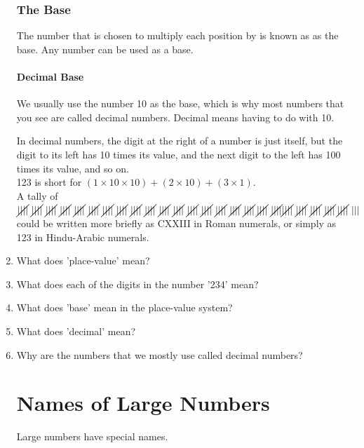 \documentclass{article}
\begin{document}
\begin{enumerate}
\subsubsection*{The Base}
The number that is chosen to multiply each position by is known as as the base. Any number can be used as a base.

\paragraph{Decimal Base}
We usually use the number 10 as the base, which is why most numbers that you see are called decimal numbers. Decimal means having to do with 10.

In decimal numbers, the digit at the right of a number is just itself, but the digit to its left has 10 times its value, and the next digit to the left has 100 times its value, and so on.\\

123 is short for $(1 \times 10 \times 10) + (2 \times 10) + (3 \times 1)$.\\

A tally of $\cancel{||||}\ \cancel{||||}\ \cancel{||||}\ \cancel{||||}\ \cancel{||||}\ \cancel{||||}\ \cancel{||||}\ \cancel{||||}\ \cancel{||||}\ \cancel{||||}\ \cancel{||||}\ \cancel{||||}\ \cancel{||||}\ \cancel{||||}\ \cancel{||||}\ \cancel{||||}\ \cancel{||||}\: \cancel{||||}\ \cancel{||||}\ \\ \cancel{||||}\ \cancel{||||}\ \cancel{||||}\ \cancel{||||}\: \cancel{||||}\ |||$ could be written more briefly as CXXIII in Roman numerals, or simply as 123 in Hindu-Arabic numerals.

\item What does 'place-value' mean?
\item What does each of the digits in the number '234' mean?
\item What does 'base' mean in the place-value system?
\item What does 'decimal' mean?
\item Why are the numbers that we mostly use called decimal numbers?

\newpage

\section*{Names of Large Numbers}
Large numbers have special names.


\end{enumerate}
\end{document}
